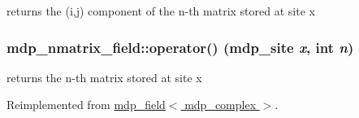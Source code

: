 returns the (i,j) component of the n-\/th matrix stored at site x \hypertarget{classmdp__nmatrix__field_a389126da9ddf86d42b27d4d9d20245f8}{
\subsubsection[{operator()}]{ mdp\_\-nmatrix\_\-field::operator() ({\bf mdp\_\-site} {\em x}, \/  int {\em n})}}
\label{classmdp__nmatrix__field_a389126da9ddf86d42b27d4d9d20245f8}


returns the n-\/th matrix stored at site x 

Reimplemented from \hyperlink{classmdp__field_a9eec94ee723253a196ccc4677832b4a0}{mdp\_\-field$<$ mdp\_\-complex $>$}.

